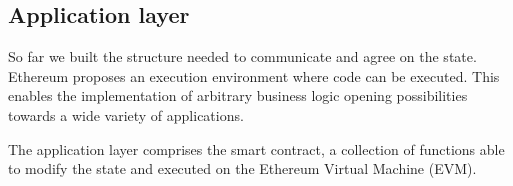 \subsection{Application layer}

So far we built the structure needed to communicate and agree on the state.
Ethereum proposes an execution environment where code can be executed. This
enables the implementation of arbitrary business logic opening possibilities
towards a wide variety of applications.

The application layer comprises the smart contract, a collection of functions
able to modify the state and executed on the Ethereum Virtual Machine (EVM).
